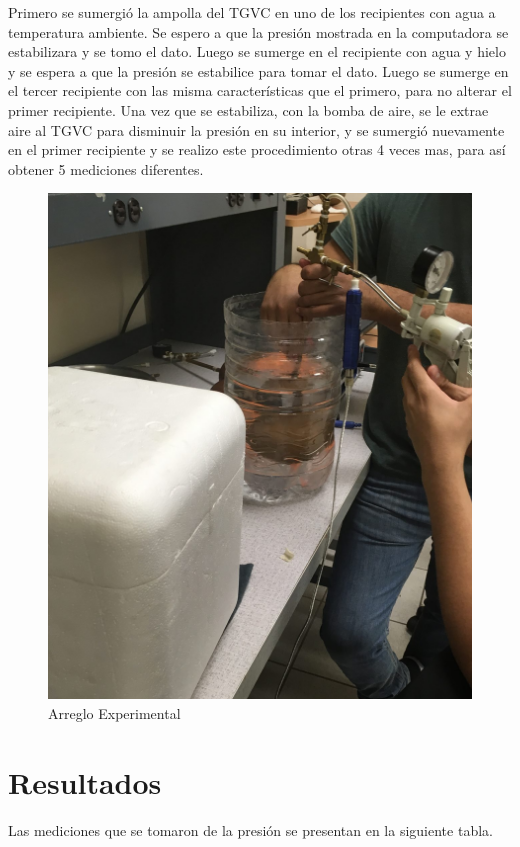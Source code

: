 \documentclass[12pt]{article}
\begin{document}
\hspace*{0.5cm}Primero se sumergió la ampolla del TGVC en uno de los recipientes con agua a temperatura ambiente. Se espero a que la presión mostrada en la computadora se estabilizara y se tomo el dato. Luego se sumerge en el recipiente con agua y hielo y se espera a que la presión se estabilice para tomar el dato. Luego se sumerge en el tercer recipiente con las misma características que el primero, para no alterar el primer recipiente. Una vez que se estabiliza, con la bomba de aire, se le extrae aire al TGVC para disminuir la presión en su interior, y se sumergió nuevamente en el primer recipiente y se realizo este procedimiento otras 4 veces mas, para así obtener 5 mediciones diferentes.
\begin{figure}[H]
\centering
\includegraphics[scale=0.25]{arr.png}
\caption{Arreglo Experimental}
\end{figure}
\pagebreak

\section{Resultados}
Las mediciones que se tomaron de la presión se presentan en la siguiente tabla.
\end{document}
